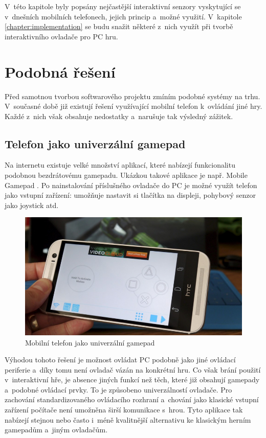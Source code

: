 \documentclass[thesis=B,czech,hidelinks]{FITthesis}[2012/06/26] %
\begin{document}
V~této kapitole byly popsány nejčastější interaktivní senzory vyskytující se v~dnešních mobilních telefonech, jejich princip a~možné využití. V~kapitole \ref{chapter:implementation} se budu snažit některé z~nich využít při tvorbě interaktivního ovladače pro PC hru. 

\chapter{Podobná řešení}

Před samotnou tvorbou softwarového projektu zmíním podobné systémy na trhu. V~současné době již existují řešení využívající mobilní telefon k~ovládání jiné hry. Každé z~nich však obsahuje nedostatky a~narušuje tak výsledný zážitek.

\section{Telefon jako univerzální gamepad}

Na internetu existuje velké množství aplikací, které nabízejí funkcionalitu podobnou bezdrátovému gamepadu. Ukázkou takové aplikace je např. Mobile Gamepad \cite{mobilegamepad}. Po nainstalování příslušného ovladače do PC je možné využít telefon jako vstupní zařízení: umožňuje nastavit si tlačítka na displeji, pohybový senzor jako joystick atd.

\begin{figure}[h]
\includegraphics[width=\textwidth]{mobile_gamepad}
\caption{Mobilní telefon jako univerzální gamepad\cite{mobilegamepad}}
\end{figure}

Výhodou tohoto řešení je možnost ovládat PC podobně jako jiné ovládací periferie a~díky tomu není ovladač vázán na konkrétní hru. Co však brání použití v~interaktivní hře, je absence jiných funkcí než těch, které již obsahují gamepady a~podobné ovládací prvky. To je způsobeno univerzálností ovladače. Pro zachování standardizovaného ovládacího rozhraní a~chování jako klasické vstupní zařízení počítače není umožněna širší komunikace s~hrou. Tyto aplikace tak nabízejí stejnou nebo často i~méně kvalitnější alternativu ke klasickým herním gamepadům a~jiným ovladačům. 
\end{document}
